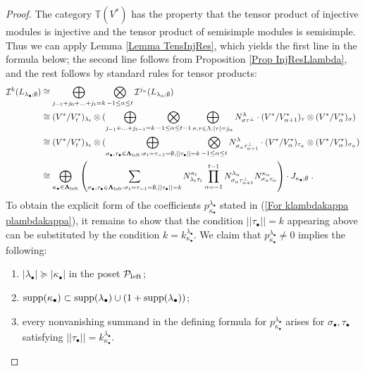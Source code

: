 \documentclass[12pt]{article}
\def\TT {{\mathbb T}}     %
\def\mc {\mathcal}
\begin{document}
\begin{proof}
The category $\TT(V^*)$ has the property that the tensor product of injective modules is injective and the tensor product of semisimple modules is semisimple. Thus we can apply Lemma \ref{Lemma TensInjRes}, which yields the first line in the formula below; the second line follows from Proposition \ref{Prop InjResLlambda}, and the rest follows by standard rules for tensor products:
\begin{align*}
\mc I^{k}(L_{\lambda_\bullet;\emptyset}) &\cong \bigoplus\limits_{j_{-1}+j_0+...+j_{t}=k}\bigotimes\limits_{-1\leq\alpha\leq t} \mc I^{j_\alpha}(L_{\lambda_\alpha;\emptyset}) \\
& \cong (V^*/V^*_{t})_{\lambda_t}\otimes ( \bigoplus\limits_{j_{-1}+...+j_{t-1}=k}\bigotimes\limits_{-1\leq\alpha\leq t-1} \bigoplus\limits_{\sigma,\tau\in\Lambda:|\tau|=j_\alpha}N_{\sigma\tau^\perp}^{\lambda} \cdot (V^*/V^*_{\alpha+1})_{\tau}\otimes (V^*/V^*_{\alpha})_{\sigma} ) \\
& \cong (V^*/V^*_{t})_{\lambda_t}\otimes ( \bigoplus\limits_{\sigma_\bullet,\tau_\bullet\in\bm\Lambda_{\rm left}:\sigma_t=\tau_{-1}=\emptyset,||\tau_\bullet||=k} \bigotimes\limits_{-1\leq\alpha\leq t} N_{\sigma_\alpha\tau_{\alpha+1}^\perp}^{\lambda} \cdot (V^*/V^*_{\alpha})_{\tau_{\alpha}}\otimes (V^*/V^*_{\alpha})_{\sigma_\alpha} ) \\
& \cong \bigoplus\limits_{\kappa_\bullet\in\bm\Lambda_{\rm left}} \left(\sum\limits_{\sigma_\bullet,\tau_\bullet\in\bm\Lambda_{\rm left}:\sigma_t=\tau_{-1}=\emptyset,||\tau_\bullet||=k} N^{\kappa_t}_{\lambda_t \tau_t} \prod\limits_{\alpha=-1}^{t-1} N^{\lambda_\alpha}_{\sigma_\alpha \tau_{\alpha+1}^\perp} N^{\kappa_\alpha}_{\sigma_\alpha \tau_\alpha} \right)\cdot J_{\kappa_\bullet;\emptyset} \;.
\end{align*}
To obtain the explicit form of the coefficients $p^{\lambda_\bullet}_{\kappa_\bullet}$ stated in (\ref{For klambdakappa plambdakappa}), it remains to show that the condition $||\tau_\bullet||=k$ appearing above can be substituted by the condition $k=k^{\lambda_\bullet}_{\kappa_\bullet}$. We claim that $p^{\lambda_\bullet}_{\kappa_\bullet}\ne0$ implies the following:
\begin{enumerate}
\item $|\lambda_\bullet|\succeq|\kappa_\bullet|$ in the poset $\mc P_{\rm left}$;
\item ${\rm supp}(\kappa_\bullet)\subset {\rm supp}(\lambda_\bullet)\cup (1+{\rm supp}(\lambda_\bullet))$;
\item every nonvanishing summand in the defining formula for $p^{\lambda_\bullet}_{\kappa_\bullet}$ arises for $\sigma_\bullet,\tau_\bullet$ satisfying $||\tau_\bullet||=k^{\lambda_\bullet}_{\kappa_\bullet}$.

\end{enumerate}
\end{proof}
\end{document}

